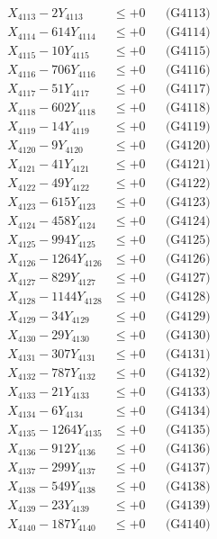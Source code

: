 \documentclass[a4paper,10pt]{article}
\begin{document}
{\begin{align}
X_{4113} - 2Y_{4113} &\leq +0 && \text{(G4113)} \\
X_{4114} - 614Y_{4114} &\leq +0 && \text{(G4114)} \\
X_{4115} - 10Y_{4115} &\leq +0 && \text{(G4115)} \\
X_{4116} - 706Y_{4116} &\leq +0 && \text{(G4116)} \\
X_{4117} - 51Y_{4117} &\leq +0 && \text{(G4117)} \\
X_{4118} - 602Y_{4118} &\leq +0 && \text{(G4118)} \\
X_{4119} - 14Y_{4119} &\leq +0 && \text{(G4119)} \\
X_{4120} - 9Y_{4120} &\leq +0 && \text{(G4120)} \\
\allowbreak
X_{4121} - 41Y_{4121} &\leq +0 && \text{(G4121)} \\
X_{4122} - 49Y_{4122} &\leq +0 && \text{(G4122)} \\
X_{4123} - 615Y_{4123} &\leq +0 && \text{(G4123)} \\
X_{4124} - 458Y_{4124} &\leq +0 && \text{(G4124)} \\
X_{4125} - 994Y_{4125} &\leq +0 && \text{(G4125)} \\
X_{4126} - 1264Y_{4126} &\leq +0 && \text{(G4126)} \\
X_{4127} - 829Y_{4127} &\leq +0 && \text{(G4127)} \\
X_{4128} - 1144Y_{4128} &\leq +0 && \text{(G4128)} \\
X_{4129} - 34Y_{4129} &\leq +0 && \text{(G4129)} \\
X_{4130} - 29Y_{4130} &\leq +0 && \text{(G4130)} \\
\allowbreak
X_{4131} - 307Y_{4131} &\leq +0 && \text{(G4131)} \\
X_{4132} - 787Y_{4132} &\leq +0 && \text{(G4132)} \\
X_{4133} - 21Y_{4133} &\leq +0 && \text{(G4133)} \\
X_{4134} - 6Y_{4134} &\leq +0 && \text{(G4134)} \\
X_{4135} - 1264Y_{4135} &\leq +0 && \text{(G4135)} \\
X_{4136} - 912Y_{4136} &\leq +0 && \text{(G4136)} \\
X_{4137} - 299Y_{4137} &\leq +0 && \text{(G4137)} \\
X_{4138} - 549Y_{4138} &\leq +0 && \text{(G4138)} \\
X_{4139} - 23Y_{4139} &\leq +0 && \text{(G4139)} \\
X_{4140} - 187Y_{4140} &\leq +0 && \text{(G4140)} \\

\end{align}}
\end{document}
